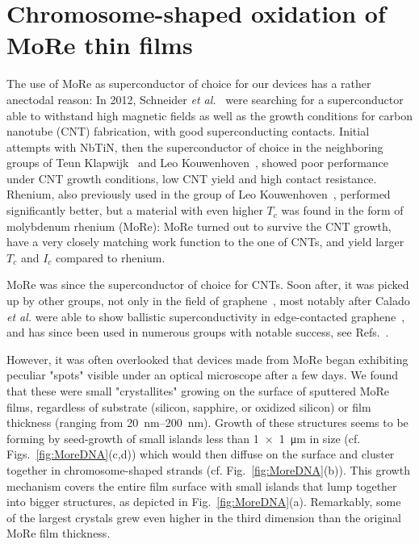 \section{Chromosome-shaped oxidation of MoRe thin films}
\label{sec:more}

The use of MoRe as superconductor of choice for our devices has a rather anectodal reason:
%
In 2012, Schneider \textit{et al.}~\cite{schneiderCouplingCarbonNanotube2012,schneiderSuspendedCarbonNanotubes2014b} were searching for a superconductor able to withstand high magnetic fields as well as the growth conditions for carbon nanotube (CNT) fabrication, with good superconducting contacts.
%
Initial attempts with NbTiN, then the superconductor of choice in the neighboring groups of Teun Klapwijk~\cite{iosadSourceOptimizationMagnetron1999} and Leo Kouwenhoven~\cite{mourikSignaturesMajoranaFermions2012}, showed poor performance under CNT growth conditions, low CNT yield and high contact resistance.
%
Rhenium, also previously used in the group of Leo Kouwenhoven~\cite{keijzersJosephsonEffectsCarbon2012}, performed significantly better, but a material with even higher $T_c$ was found in the form of molybdenum rhenium (MoRe):
%
MoRe turned out to survive the CNT growth, have a very closely matching work function to the one of CNTs, and yield larger $T_c$ and $I_c$ compared to rhenium.

MoRe was since the superconductor of choice for CNTs.
%
Soon after, it was picked up by other groups, not only in the field of graphene~\cite{azizMolybdenumrheniumSuperconductingSuspended2014a}, most notably after Calado \textit{et al.} were able to show ballistic superconductivity in edge-contacted graphene~\cite{caladoBallisticJosephsonJunctions2015d}, and has since been used in numerous groups with notable success, see Refs.~\cite{singhMolybdenumrheniumAlloyBased2014,gotzCosputteredMoReThin2016,blienCarbonNanotubeGrowth2016a,draelosSupercurrentFlowMultiterminal2019,ametSupercurrentQuantumHall2016b,islandThicknessDependentInterlayer2016a,krollMagneticFieldCompatible2018}.


However, it was often overlooked that devices made from MoRe began exhibiting peculiar "spots" visible under an optical microscope after a few days.
% 
We found that these were small "crystallites" growing on the surface of sputtered MoRe films, regardless of substrate (silicon, sapphire, or oxidized silicon) or film thickness (ranging from \SIrange{20}{200}{\nano\meter}).
%
Growth of these structures seems to be forming by seed-growth of small islands less than \SI{1x1}{\micro\meter} in size (cf. Figs.~\ref{fig:MoreDNA}(c,d)) which would then diffuse on the surface and cluster together in chromosome-shaped strands (cf. Fig.~\ref{fig:MoreDNA}(b)).
%
This growth mechanism covers the entire film surface with small islands that lump together into bigger structures, as depicted in Fig.~\ref{fig:MoreDNA}(a).
%
Remarkably, some of the largest crystals grew even higher in the third dimension than the original MoRe film thickness.

